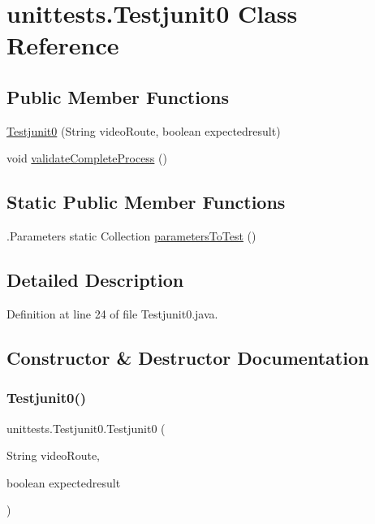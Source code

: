 \hypertarget{classunittests_1_1_testjunit0}{}\section{unittests.\+Testjunit0 Class Reference}
\label{classunittests_1_1_testjunit0}
\subsection*{Public Member Functions}
\begin{DoxyCompactItemize}
\item 
\hyperlink{classunittests_1_1_testjunit0_a51fec7642572da856d10d6f5e6c39df0}{Testjunit0} (String video\+Route, boolean expectedresult)
\item 
void \hyperlink{classunittests_1_1_testjunit0_a520f37a3bb806eb5b0aefa1d88db6d08}{validate\+Complete\+Process} ()
\end{DoxyCompactItemize}
\subsection*{Static Public Member Functions}
\begin{DoxyCompactItemize}
\item 
.Parameters static Collection \hyperlink{classunittests_1_1_testjunit0_a0958eee4a9d97a07f0d5fded1d80551a}{parameters\+To\+Test} ()
\end{DoxyCompactItemize}


\subsection{Detailed Description}


Definition at line 24 of file Testjunit0.\+java.



\subsection{Constructor \& Destructor Documentation}
\hypertarget{classunittests_1_1_testjunit0_a51fec7642572da856d10d6f5e6c39df0}{}\label{classunittests_1_1_testjunit0_a51fec7642572da856d10d6f5e6c39df0} 
\subsubsection{\texorpdfstring{Testjunit0()}{Testjunit0()}}
{\footnotesize\ttfamily unittests.\+Testjunit0.\+Testjunit0 (\begin{DoxyParamCaption}\item[{String}]{video\+Route,  }\item[{boolean}]{expectedresult }\end{DoxyParamCaption})}



